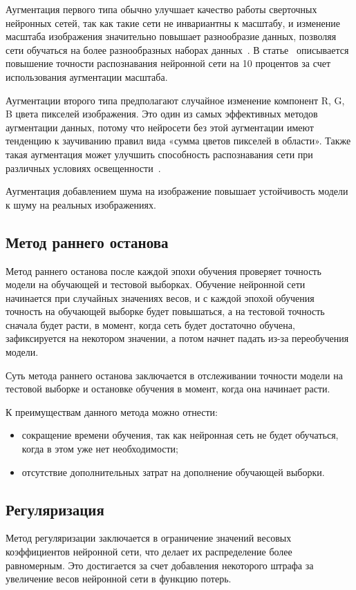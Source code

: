 Аугментация первого типа обычно улучшает качество работы сверточных нейронных сетей, так как такие сети не инвариантны к масштабу, и изменение масштаба изображения значительно повышает разнообразие данных, позволяя сети обучаться на более разнообразных наборах данных~\cite{augmentation}. В статье~\cite{augmentation1} описывается повышение точности распознавания нейронной сети на 10 процентов за счет использования аугментации масштаба.

Аугментации второго типа предполагают случайное изменение компонент R, G, B цвета пикселей изображения. Это один из самых эффективных методов аугментации данных, потому что нейросети без этой аугментации имеют тенденцию к заучиванию правил вида «сумма цветов пикселей в области». Также такая аугментация может улучшить способность распознавания сети при различных условиях освещенности~\cite{augmentation}.

Аугментация добавлением шума на изображение повышает устойчивость модели к шуму на реальных изображениях.

\subsection{Метод раннего останова}
Метод раннего останова после каждой эпохи обучения проверяет точность модели на обучающей и тестовой выборках. Обучение нейронной сети начинается при случайных значениях весов, и с каждой эпохой обучения точность на обучающей выборке будет повышаться, а на тестовой точность сначала будет расти, в момент, когда сеть будет достаточно обучена, зафиксируется на некотором значении, а потом начнет падать из-за переобучения модели.

Суть метода раннего останова заключается в отслеживании точности модели на тестовой выборке и остановке обучения в момент, когда она начинает расти.

К преимуществам данного метода можно отнести:
\begin{itemize}
	\item сокращение времени обучения, так как нейронная сеть не будет обучаться, когда в этом уже нет необходимости;
	\item отсутствие дополнительных затрат на дополнение обучающей выборки.
\end{itemize}

\subsection{Регуляризация}
Метод регуляризации заключается в ограничение значений весовых коэффициентов нейронной сети, что делает их распределение более равномерным. Это достигается за счет добавления некоторого штрафа за увеличение весов нейронной сети в функцию потерь.

